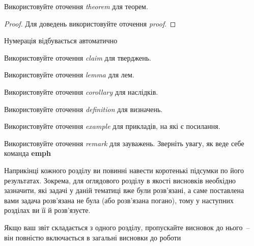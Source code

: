 \begin{theorem}
Використовуйте оточення \emph{theorem} для теорем.
\end{theorem}
\begin{proof}
Для доведень використовуйте оточення \emph{proof}.
\end{proof}
\begin{theorem}
Нумерація відбувається автоматично
\end{theorem}
\begin{claim}
Використовуйте оточення \emph{claim} для тверджень.
\end{claim}
\begin{lemma}
Використовуйте оточення \emph{lemma} для лем.
\end{lemma}
\begin{corollary}
Використовуйте оточення \emph{corollary} для наслідків.
\end{corollary}
\begin{definition}
Використовуйте оточення \emph{definition} для визначень.
\end{definition}
\begin{example}
Використовуйте оточення \emph{example} для прикладів, на які є посилання.
\end{example}
\begin{remark}
Використовуйте оточення \emph{remark} для зауважень. Зверніть увагу, як 
веде себе команда \textbf{emph}
\end{remark}


\chapconclude{\ref{chap:review}}

Наприкінці кожного розділу ви повинні навести коротенькі підсумки по його 
результатах. Зокрема, для оглядового розділу в якості висновків необхідно 
зазначити, які задачі у даній тематиці вже були розв'язані, а саме 
поставлена вами задача розв'язана не була (або розв'язана погано), тому у 
наступних розділах ви її й розв'язуєте.

Якщо ваш звіт складається з одного розділу, пропускайте висновок до 
нього~-- він повністю включається в загальні висновки до роботи